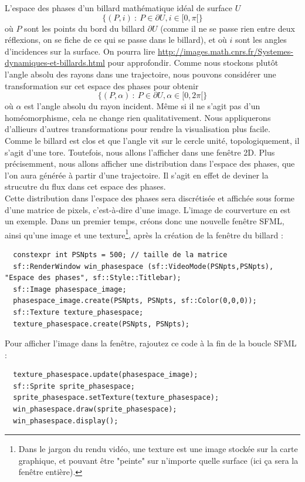 \documentclass{book}
\begin{document}
L'espace des phases d'un billard mathématique idéal de surface $U$ 
$$\{ (P,i)\ :\ P\in\partial U, i\in[0,\pi[\}$$
où $P$ sont les points du bord du billard $\partial U$ (comme il ne se passe rien entre deux réflexions, on se fiche de ce qui se passe dans le billard), et où $i$ sont les angles d'incidences sur la surface. On pourra lire \url{http://images.math.cnrs.fr/Systemes-dynamiques-et-billards.html} pour approfondir. Comme nous stockons plutôt l'angle absolu des rayons dans une trajectoire, nous pouvons considérer une transformation sur cet espace des phases pour obtenir
$$\{ (P,\alpha)\ :\ P\in\partial U, \alpha\in[0,2\pi[\}$$
où $\alpha$ est l'angle absolu du rayon incident. Même si il ne s'agit pas d'un homéomorphisme, cela ne change rien qualitativement. Nous appliquerons d'allieurs d'autres transformations pour rendre la visualisation plus facile. Comme le billard est clos et que l'angle vit sur le cercle unité, topologiquement, il s'agit d'une tore. Toutefois, nous allons l'afficher dans une fenêtre 2D. Plus précisemment, nous allons afficher une distribution dans l'espace des phases, que l'on aura générée à partir d'une trajectoire. Il s'agit en effet de deviner la strucutre du flux dans cet espace des phases.\\

Cette distribution dans l'espace des phases sera discrétisée et affichée sous forme d'une matrice de pixels, c'est-à-dire d'une image. L'image de courverture en est un exemple. Dans un premier temps, créons donc une nouvelle fenêtre SFML, ainsi qu'une image et une texture\footnote{Dans le jargon du rendu vidéo, une texture est une image stockée sur la carte graphique, et pouvant être "peinte" sur n'importe quelle surface (ici ça sera la fenêtre entière).}, après la création de la fenêtre du billard :
\begin{verbatim}
  constexpr int PSNpts = 500; // taille de la matrice
  sf::RenderWindow win_phasespace (sf::VideoMode(PSNpts,PSNpts), "Espace des phases", sf::Style::Titlebar);
  sf::Image phasespace_image;
  phasespace_image.create(PSNpts, PSNpts, sf::Color(0,0,0));
  sf::Texture texture_phasespace;
  texture_phasespace.create(PSNpts, PSNpts);
\end{verbatim}
Pour afficher l'image dans la fenêtre, rajoutez ce code à la fin de la boucle SFML :
\begin{verbatim}
  texture_phasespace.update(phasespace_image);
  sf::Sprite sprite_phasespace;
  sprite_phasespace.setTexture(texture_phasespace);
  win_phasespace.draw(sprite_phasespace);
  win_phasespace.display();
\end{verbatim}
\end{document}
